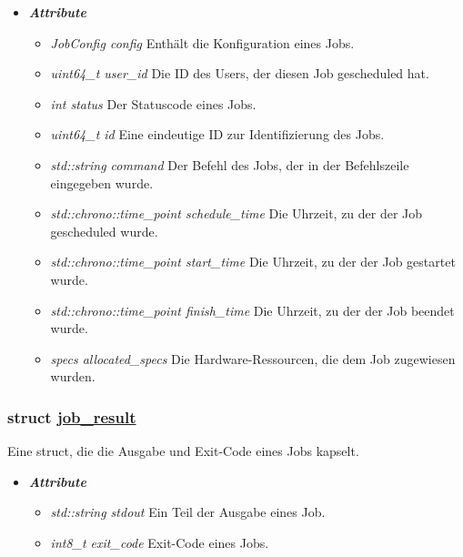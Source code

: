 \documentclass[a4paper,12pt]{article}
\newcommand\purl[1]{\protect\url{#1}}
\begin{document}
\begin{itemize}[label={}]

	\item \textit{\textbf{Attribute}}
		\begin{itemize}[label={\textbullet}]
			\item \textit{JobConfig config} Enthält die Konfiguration eines Jobs.
			
			\item \textit{uint64\_t user\_id} Die ID des Users, der diesen Job gescheduled hat.
			
			\item \textit{int status} Der Statuscode eines Jobs.
			
			\item \textit{uint64\_t id} Eine eindeutige ID zur Identifizierung des Jobs.
			
			\item \textit{std::string command} Der Befehl des Jobs, der in der Befehlszeile eingegeben wurde.
			
			\item \textit{std::chrono::time\_point schedule\_time} Die Uhrzeit, zu der der Job gescheduled wurde.
			
			\item \textit{std::chrono::time\_point start\_time} Die Uhrzeit, zu der der Job gestartet wurde.
			
			\item \textit{std::chrono::time\_point finish\_time} Die Uhrzeit, zu der der Job beendet wurde.
			
			\item \textit{specs allocated\_specs} Die Hardware-Ressourcen, die dem Job zugewiesen wurden.

		\end{itemize}


\end{itemize}

\subsubsection{struct \purl{job_result}}

Eine struct, die die Ausgabe und Exit-Code eines Jobs kapselt.

\begin{itemize}[label={}]

	\item \textit{\textbf{Attribute}}
		\begin{itemize}[label={\textbullet}]
			\item \textit{std::string stdout} Ein Teil der Ausgabe eines Job.
			
			\item \textit{int8\_t exit\_code} Exit-Code eines Jobs.
			
		\end{itemize}


\end{itemize}
\clearpage
\end{document}
